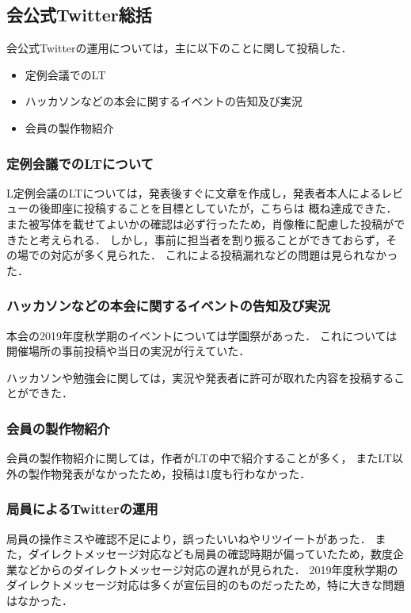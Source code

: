 \subsection*{会公式Twitter総括}


会公式Twitterの運用については，主に以下のことに関して投稿した．
\begin{itemize}
\item 定例会議でのLT
\item ハッカソンなどの本会に関するイベントの告知及び実況
\item 会員の製作物紹介
\end{itemize}

\subsubsection*{定例会議でのLTについて}
L定例会議のLTについては，発表後すぐに文章を作成し，発表者本人によるレビューの後即座に投稿することを目標としていたが，こちらは 概ね達成できた．
また被写体を載せてよいかの確認は必ず行ったため，肖像権に配慮した投稿ができたと考えられる．
しかし，事前に担当者を割り振ることができておらず，その場での対応が多く見られた．
これによる投稿漏れなどの問題は見られなかった．

\subsubsection*{ハッカソンなどの本会に関するイベントの告知及び実況}
本会の2019年度秋学期のイベントについては学園祭があった．
これについては開催場所の事前投稿や当日の実況が行えていた．

ハッカソンや勉強会に関しては，実況や発表者に許可が取れた内容を投稿することができた．

\subsubsection*{会員の製作物紹介}
会員の製作物紹介に関しては，作者がLTの中で紹介することが多く，
またLT以外の製作物発表がなかったため，投稿は1度も行わなかった．

\subsubsection*{局員によるTwitterの運用}
局員の操作ミスや確認不足により，誤ったいいねやリツイートがあった．
また，ダイレクトメッセージ対応なども局員の確認時期が偏っていたため，数度企業などからのダイレクトメッセージ対応の遅れが見られた．
2019年度秋学期のダイレクトメッセージ対応は多くが宣伝目的のものだったため，特に大きな問題はなかった．
